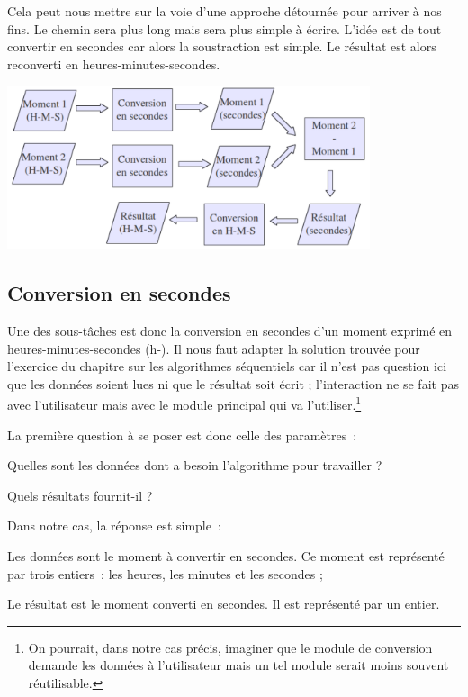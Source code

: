 	Cela peut nous mettre sur la voie d'une approche
	détournée pour arriver à nos fins. Le chemin sera plus long mais sera
	plus simple à écrire. L'idée est de tout convertir en
	secondes car alors la soustraction est simple. Le résultat est alors
	reconverti en heures-minutes-secondes.

	\begin{center}
	\includegraphics[width=0.8\textwidth]{image/module-conversion}
	\end{center}

\subsection*{Conversion en secondes}

	Une des sous-tâches est donc la conversion en secondes
	d'un moment exprimé en heures-minutes-secondes
	(h-). Il nous faut adapter la solution trouvée pour
	l'exercice du chapitre sur les algorithmes séquentiels
	car il n'est pas question ici que les données soient
	lues ni que le résultat soit écrit ; l'interaction ne
	se fait pas avec l'utilisateur mais avec le module
	principal qui va l'utiliser.\footnote{On pourrait,
	dans notre cas précis, imaginer que le module de conversion demande les
	données à l'utilisateur mais un tel module serait
	moins souvent réutilisable.}

	La première question à se poser est donc celle des paramètres~:

	\begin{liste}
	\item 
		Quelles sont les données dont a besoin l'algorithme
		pour travailler ?
	\item 
		Quels résultats fournit-il ?
	\end{liste}

	Dans notre cas, la réponse est simple~:

	\begin{liste}
	\item {
		Les données sont le moment à convertir en secondes. Ce moment est
		représenté par trois entiers~: les heures, les minutes et les secondes
		;}
	\item {
		Le résultat est le moment converti en secondes. Il est représenté par un
		entier.}
	\end{liste}

